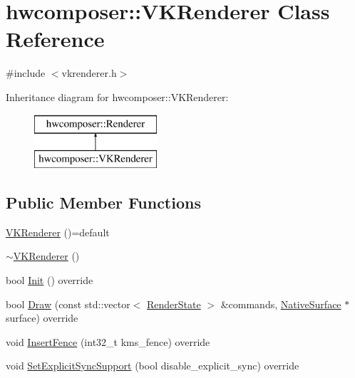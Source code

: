 \hypertarget{classhwcomposer_1_1VKRenderer}{}\section{hwcomposer\+:\+:V\+K\+Renderer Class Reference}
\label{classhwcomposer_1_1VKRenderer}


{\ttfamily \#include $<$vkrenderer.\+h$>$}

Inheritance diagram for hwcomposer\+:\+:V\+K\+Renderer\+:\begin{figure}[H]
\begin{center}
\leavevmode
\includegraphics[height=2.000000cm]{classhwcomposer_1_1VKRenderer}
\end{center}
\end{figure}
\subsection*{Public Member Functions}
\begin{DoxyCompactItemize}
\item 
\mbox{\hyperlink{classhwcomposer_1_1VKRenderer_acd726cc3da3bbabca0319084b8fb3adb}{V\+K\+Renderer}} ()=default
\item 
\mbox{\hyperlink{classhwcomposer_1_1VKRenderer_aa9c49647acea66ac3dce97db89573e3a}{$\sim$\+V\+K\+Renderer}} ()
\item 
bool \mbox{\hyperlink{classhwcomposer_1_1VKRenderer_aa5ec08a716d38af3c59827b05045e56f}{Init}} () override
\item 
bool \mbox{\hyperlink{classhwcomposer_1_1VKRenderer_a05f1c449173cc2b4f479bf5be404ebb3}{Draw}} (const std\+::vector$<$ \mbox{\hyperlink{structhwcomposer_1_1RenderState}{Render\+State}} $>$ \&commands, \mbox{\hyperlink{classhwcomposer_1_1NativeSurface}{Native\+Surface}} $\ast$surface) override
\item 
void \mbox{\hyperlink{classhwcomposer_1_1VKRenderer_abbaf31607e1572de1e74de4d2ea50a03}{Insert\+Fence}} (int32\+\_\+t kms\+\_\+fence) override
\item 
void \mbox{\hyperlink{classhwcomposer_1_1VKRenderer_ad0a97c5d88ce71c265a6bd5ee139ffe7}{Set\+Explicit\+Sync\+Support}} (bool disable\+\_\+explicit\+\_\+sync) override
\end{DoxyCompactItemize}


